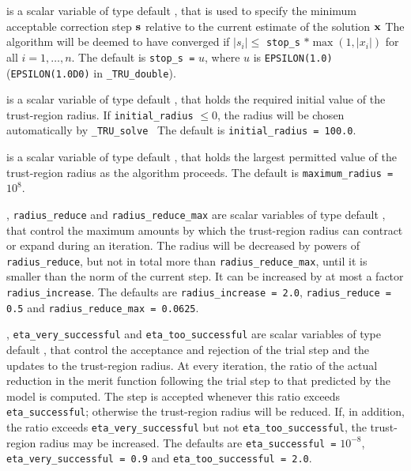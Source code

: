 \documentclass{galahad}
\newcommand{\packagename}{TRU}
\newcommand{\fullpackagename}{\libraryname\_\packagename}
\newcommand{\solver}{{\tt \fullpackagename\_solve}}
\begin{document}
\begin{description}
 is a scalar variable of type default \realdp,
that is used to specify the minimum acceptable correction step ${\mathbf{s}}$
relative to the current estimate of the solution ${\mathbf{x}}$
The algorithm will be deemed to have converged if $|s_i| \leq$
{\tt stop\_s} $\ast \max( 1, |x_i|)$ for all $i = 1, \ldots, n$.
The default is {\tt stop\_s =} $u$,
where $u$ is {\tt EPSILON(1.0)} ({\tt EPSILON(1.0D0)} in
{\tt \fullpackagename\_double}).

 is a scalar variable of type default \realdp, that holds
the required initial value of the trust-region radius. If
{\tt initial\_radius} $\leq 0$, the radius will be chosen automatically
by \solver\
The default is {\tt initial\_radius = 100.0}.

 is a scalar variable of type default \realdp, that holds
the largest permitted value of the trust-region radius as the algorithm
proceeds.
The default is {\tt maximum\_radius =} $10^8$.

,
{\tt radius\_reduce} and
{\tt radius\_reduce\_max}
are scalar variables of type default \realdp, that
control the maximum amounts by which the trust-region radius can
contract or expand during an iteration. The radius will be decreased by
powers of {\tt radius\_reduce}, but not in total
more than  {\tt radius\_reduce\_max}, until it is smaller than the norm of
the current step.
It can be increased by at most a factor {\tt radius\_increase}.
The defaults are
{\tt radius\_increase = 2.0},
{\tt radius\_reduce = 0.5} and
{\tt radius\_reduce\_max = 0.0625}.

, {\tt eta\_very\_successful}
and {\tt eta\_too\_successful}
are scalar variables of type default
\realdp, that control the acceptance and rejection of the trial step
and the updates to the trust-region radius.
At every iteration, the ratio of the actual reduction in the merit function
following the trial step to that predicted by the model is computed.
The step is accepted whenever this ratio exceeds {\tt eta\_successful};
otherwise the trust-region radius will be reduced.
If, in addition, the ratio exceeds {\tt eta\_very\_successful} but not
{\tt eta\_too\_successful}, the trust-region radius may be increased.
The defaults are
{\tt eta\_successful =} $10^{-8}$,
{\tt eta\_very\_successful = 0.9} and
{\tt eta\_too\_successful = 2.0}.


\end{description}
\end{document}
